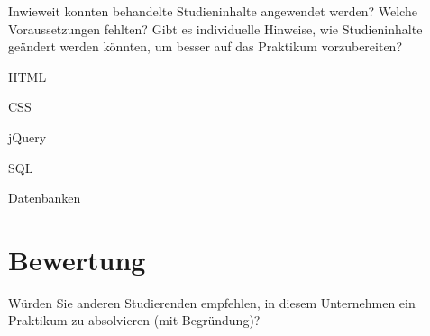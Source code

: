 Inwieweit konnten behandelte Studieninhalte angewendet werden? Welche Voraussetzungen fehlten? Gibt es individuelle Hinweise, wie Studieninhalte geändert werden könnten, um besser auf das Praktikum vorzubereiten?

HTML

CSS

jQuery

SQL

Datenbanken


\section{Bewertung}

Würden Sie anderen Studierenden empfehlen, in diesem Unternehmen ein Praktikum zu absolvieren (mit Begründung)?